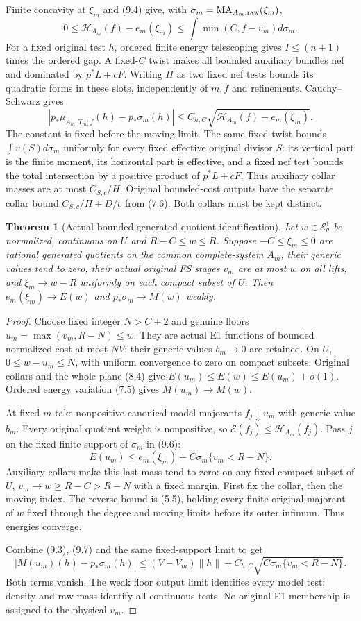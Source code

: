 \documentclass[10pt]{article}
\newtheorem{theorem}{Theorem}[section]
\newcommand{\MA}{\operatorname{MA}}
\newcommand{\EE}{\mathcal E^1_\theta}
\begin{document}
Finite concavity at $\xi_m$ and (9.4) give, with
$\sigma_m=\MA_{A_m,\rm raw}(\xi_m)$,
\[
 0\leq\mathscr H_{A_m}(f)-e_m(\xi_m)
 \leq\int\min(C,f-v_m)d\sigma_m.
 \tag{9.6}
\]
For a fixed original test $h$, ordered finite energy telescoping gives
$I\leq(n+1)$ times the ordered gap. A fixed-$C$ twist makes all
bounded auxiliary bundles nef and dominated by $p^*L+cF$.
Writing $H$ as two fixed nef tests bounds its quadratic forms in these
slots, independently of $m,f$ and refinements. Cauchy--Schwarz gives
\[
 |p_*\mu_{A_m,T_m;f}(h)-p_*\sigma_m(h)|
 \leq C_{h,C}\sqrt{\mathscr H_{A_m}(f)-e_m(\xi_m)}.
 \tag{9.7}
\]
The constant is fixed before the moving limit.
The same fixed twist bounds $\int v(S)d\sigma_m$ uniformly for
every fixed effective original divisor $S$: its vertical part is the
finite moment, its horizontal part is effective, and a fixed nef test
bounds the total intersection by a positive product of $p^*L+cF$.
Thus auxiliary collar masses are at most $C_{S,c}/H$.
Original bounded-cost outputs have the separate collar bound
$C_{S,c}/H+D/c$ from (7.6). Both collars must be kept distinct.

\begin{theorem}[Actual bounded generated quotient identification]\label{bounded}
Let $w\in\EE$ be normalized, continuous on $U$ and
$R-C\leq w\leq R$. Suppose $-C\leq\xi_m\leq0$ are rational
generated quotients on the common complete-system $A_m$, their generic
values tend to zero, their actual original FS stages $v_m$ are at most
$w$ on all lifts, and $\xi_m\to w-R$ uniformly on each compact subset
of $U$. Then $e_m(\xi_m)\to E(w)$ and $p_*\sigma_m\to M(w)$ weakly.
\end{theorem}
\begin{proof}
Choose fixed integer $N>C+2$ and genuine floors
$u_m=\max(v_m,R-N)\leq w$. They are actual E1 functions of bounded
normalized cost at most $NV$; their generic values $b_m\to0$ are
retained. On $U$, $0\leq w-u_m\leq N$, with uniform convergence
to zero on compact subsets. Original collars and the whole plane (8.4)
give $E(u_m)\leq E(w)\leq E(u_m)+o(1)$. Ordered energy variation
(7.5) gives $M(u_m)\to M(w)$.

At fixed $m$ take nonpositive canonical model majorants $f_j\downarrow
u_m$ with generic value $b_m$. Every original quotient weight is
nonpositive, so $\mathscr E(f_j)\leq\mathscr H_{A_m}(f_j)$.
Pass $j$ on the fixed finite support of $\sigma_m$ in (9.6):
\[
 E(u_m)\leq e_m(\xi_m)
       +C\sigma_m\{v_m<R-N\}.
 \tag{9.8}
\]
Auxiliary collars make this last mass tend to zero: on any fixed compact
subset of $U$, $v_m\to w\geq R-C>R-N$ with a fixed margin.
First fix the collar, then the moving index. The reverse bound is (5.5),
holding every finite original majorant of $w$ fixed through the degree
and moving limits before its outer infimum. Thus energies converge.

Combine (9.3), (9.7) and the same fixed-support limit to get
\[
 |M(u_m)(h)-p_*\sigma_m(h)|
 \leq(V-V_m)\|h\|+C_{h,C}\sqrt{C\sigma_m\{v_m<R-N\}}.
 \tag{9.9}
\]
Both terms vanish. The weak floor output limit identifies every model
test; density and raw mass identify all continuous tests. No original
E1 membership is assigned to the physical $v_m$.
\end{proof}
\end{document}
